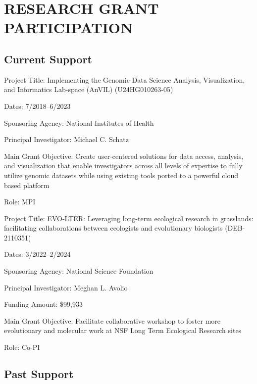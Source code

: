 \documentclass{cv}
\begin{document}


\section*{RESEARCH GRANT PARTICIPATION}

\subsection*{Current Support}

Project Title: Implementing the Genomic Data Science Analysis, Visualization, and Informatics Lab-space
(AnVIL) (U24HG010263-05)

Dates: 7/2018--6/2023

Sponsoring Agency: National Institutes of Health

Principal Investigator: Michael C. Schatz

Main Grant Objective: Create user-centered solutions for data access, analysis, and visualization that enable investigators across all levels of expertise to fully utilize genomic datasets while using existing tools ported to a powerful cloud based platform

Role: MPI

\vspace{5mm}

Project Title: EVO-LTER: Leveraging long-term ecological research in grasslands: facilitating collaborations between ecologists and evolutionary biologists (DEB-2110351)

Dates: 3/2022--2/2024

Sponsoring Agency: National Science Foundation

Principal Investigator: Meghan L. Avolio

Funding Amount: \$99,933

Main Grant Objective: Facilitate collaborative workshop to foster more evolutionary and molecular work at NSF Long Term Ecological Research sites

Role: Co-PI

\subsection*{Past Support}
\end{document}
